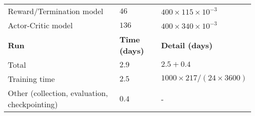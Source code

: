 \begin{table}[h!]
\begin{center}
{\begin{tabular}{|>{\raggedright\arraybackslash}p{7cm}|>{\raggedleft\arraybackslash}p{2cm}|>{\raggedleft\arraybackslash}p{3.5cm}|}
    \hspace{0.5cm} Reward/Termination model & $46$ & $400 \times 115 \times  10^{-3}$ \\
    \hspace{0.5cm} Actor-Critic model & $136$ & $400 \times 340 \times  10^{-3}$ \\
    \hline
    \textbf{Run} & \textbf{Time (days)} & \textbf{Detail (days)} \\
    \hline
    Total & $2.9$ & $2.5 + 0.4$ \\
    \hspace{0.5cm} Training time & $2.5$ & $1000 \times 217 / (24 \times 3600)$ \\
    \hspace{0.5cm} Other (collection, evaluation, checkpointing) & $0.4$ & - \\
    \hline
\end{tabular}

}

\end{center}
\end{table}

